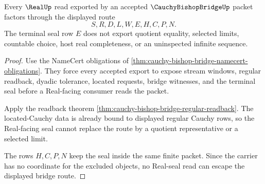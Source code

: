 \begin{theorem}
\label{thm:cauchy-bishop-bridge-real-seal-nonescape}
Every $\RealUp$ read exported by an accepted $\CauchyBishopBridgeUp$ packet factors through the displayed route
$$
S,R,D,L,W,E,H,C,P,N.
$$
The terminal seal row $E$ does not export quotient equality, selected limits, countable choice, host real completeness, or an uninspected infinite sequence.
\end{theorem}
\begin{proof}
Use the NameCert obligations of \autoref{thm:cauchy-bishop-bridge-namecert-obligations}. They force every accepted export to expose stream windows, regular readback, dyadic tolerance, located requests, bridge witnesses, and the terminal seal before a Real-facing consumer reads the packet.

Apply the readback theorem \autoref{thm:cauchy-bishop-bridge-regular-readback}. The located-Cauchy data is already bound to displayed regular Cauchy rows, so the Real-facing seal cannot replace the route by a quotient representative or a selected limit.

The rows $H,C,P,N$ keep the seal inside the same finite packet. Since the carrier has no coordinate for the excluded objects, no Real-seal read can escape the displayed bridge route.
\end{proof}


\begin{closurestatus}{\CauchyBishopBridgeUp}
  \theoryclosure{\seedClosure}
  \formalstatus{\unformalizedV}
\end{closurestatus}
